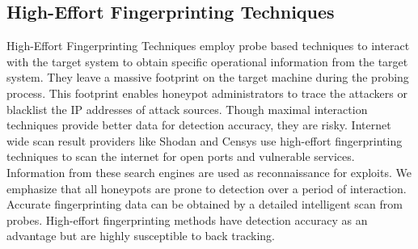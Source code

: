 \documentclass[../main.tex]{subfiles}
\begin{document}
 
 \subsection{High-Effort Fingerprinting Techniques}
High-Effort Fingerprinting Techniques employ probe based techniques to interact with the target system to obtain specific operational information from the target system. They leave a massive footprint on the target machine during the probing process. This footprint enables honeypot administrators to trace the attackers or blacklist the IP addresses of attack sources. Though maximal interaction techniques provide better data for detection accuracy, they are risky. Internet wide scan result providers like Shodan and Censys use high-effort fingerprinting techniques to scan the internet for open ports and vulnerable services. Information from these search engines are used as reconnaissance for exploits. We emphasize that all honeypots are prone to detection over a period of interaction. Accurate fingerprinting data can be obtained by a detailed intelligent scan from probes. High-effort fingerprinting methods have detection accuracy as an advantage but are highly susceptible to back tracking. 
\end{document}
